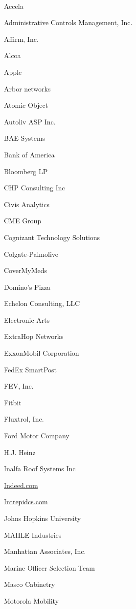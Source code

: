 \documentclass[twoside]{article}
\begin{document}
\begin{center}
\begin{multicols}{5}
        \vspace{-1em}
        ~\hrulefill~
        \vspace{-.9em}
        \begin{FlushLeft}
        \begin{compactitem}
        \item Accela
\item Administrative Controls Management, Inc.
\item Affirm, Inc.
\item Alcoa
\item Apple
\item Arbor networks
\item Atomic Object
\item Autoliv ASP Inc.
\item BAE Systems
\item Bank of America
\item Bloomberg LP
\item CHP Consulting Inc
\item Civis Analytics
\item CME Group
\item Cognizant Technology Solutions
\item Colgate-Palmolive
\item CoverMyMeds
\item Domino's Pizza
\item Echelon Consulting, LLC
\item Electronic Arts
\item ExtraHop Networks
\item ExxonMobil Corporation
\item FedEx SmartPost
\item FEV, Inc.
\item Fitbit
\item Fluxtrol, Inc.
\item Ford Motor Company
\item H.J. Heinz
\item Inalfa Roof Systems Inc
\item \url{Indeed.com}
\item \url{Intrepidcs.com}
\item Johns Hopkins University
\item MAHLE Industries
\item Manhattan Associates, Inc.
\item Marine Officer Selection Team
\item Masco Cabinetry
\item Motorola Mobility

\end{compactitem}
\end{FlushLeft}
\end{multicols}
\end{center}
\end{document}
